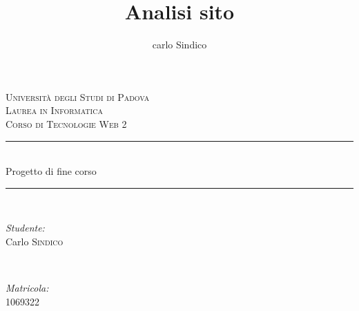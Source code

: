 \documentclass[12pt]{article}
\title{Analisi sito}
\date{}
\author{carlo Sindico}
\begin{document}



\begin{titlepage}

\newcommand{\HRule}{\rule{\linewidth}{0.5mm}} %

\center %
 

\textsc{\LARGE Universit\`a degli Studi di Padova}\\[1.5cm] %
\textsc{\Large Laurea in Informatica}\\[0.5cm] %
\textsc{\large Corso di Tecnologie Web 2}\\[0.5cm] %


\HRule \\[0.4cm]
{ \huge  Progetto di fine corso}\\[0.3cm] %
\HRule \\[1.5cm]
 

\begin{minipage}{0.4\textwidth}
\begin{flushleft} \large
\emph{Studente:}\\
Carlo \textsc{Sindico} %
\end{flushleft}
\end{minipage}
~
\begin{minipage}{0.4\textwidth}
\begin{flushright} \large
\emph{Matricola:} \\
\textsc{1069322} %
\end{flushright}
\end{minipage}\\[4cm]


\end{titlepage}
\end{document}
